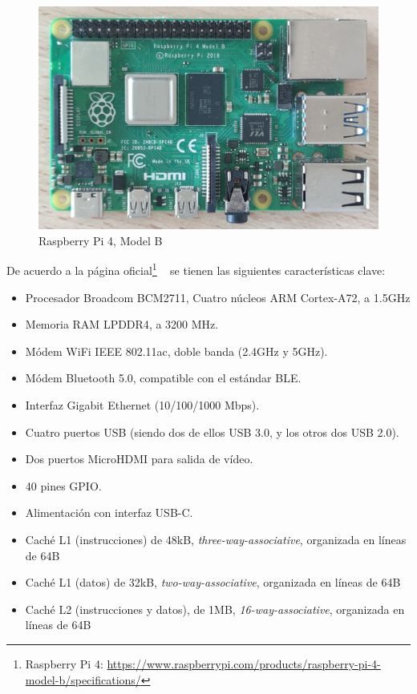\begin{figure}[ht!]
    \centering
    \includegraphics[width=0.6\linewidth, height=0.35\textwidth]{figs/rpi4.jpg}
    \caption{Raspberry Pi 4, Model B}
    \label{fig:rpi4}
\end{figure}

De acuerdo a la página oficial\footnote{Raspberry Pi 4: \url{https://www.raspberrypi.com/products/raspberry-pi-4-model-b/specifications/}} ~\cite{datasheetA72} se tienen las siguientes características clave:

\begin{itemize}[noitemsep]
    \item Procesador Broadcom BCM2711, Cuatro núcleos \ac{ARM} Cortex-A72, a 1.5GHz
    \item Memoria \ac{RAM} \ac{LPDDR4}, a 3200 MHz.
    \item Módem \ac{WiFi} IEEE 802.11ac, doble banda (2.4GHz y 5GHz).
    \item Módem Bluetooth 5.0, compatible con el estándar \ac{BLE}.
    \item Interfaz Gigabit Ethernet (10/100/1000 Mbps).
    \item Cuatro puertos \ac{USB} (siendo dos de ellos \ac{USB} 3.0, y los otros dos \ac{USB} 2.0).
    \item Dos puertos \ac{MicroHDMI} para salida de vídeo.
    \item 40 pines \ac{GPIO}.
    \item Alimentación con interfaz \ac{USB}-C.
    \item Caché L1 (instrucciones) de 48kB, \textit{three-way-associative}, organizada en líneas de 64B
    \item Caché L1 (datos) de 32kB, \textit{two-way-associative}, organizada en líneas de 64B
    \item Caché L2 (instrucciones y datos), de 1MB, \textit{16-way-associative}, organizada en líneas de 64B
\end{itemize}

